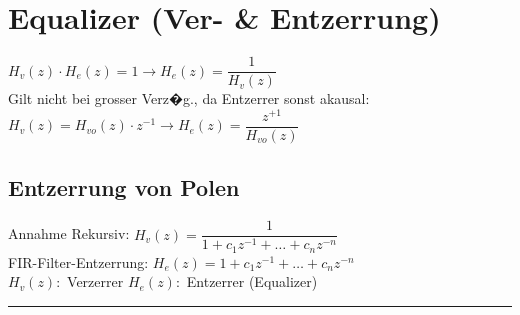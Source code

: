 \begin{minipage}{9cm}
\section{Equalizer (Ver- \& Entzerrung)}
			$H_v(z)\cdot H_e(z)=1 \longrightarrow H_e(z)=\dfrac{1}{H_v(z)}$\\

			Gilt nicht bei grosser Verz�g., da Entzerrer sonst akausal:\\
			$H_v(z)=H_{vo}(z)\cdot z^{-1} \rightarrow
			 H_e(z)=\dfrac{z^{+1}}{H_{vo}(z)}$

    \end{minipage}
		\hfill
    \begin{minipage}{9cm}    	
			\subsection{Entzerrung von Polen}
			Annahme Rekursiv: $H_v(z)=\dfrac{1}{1+c_1z^{-1}+ \ldots
			+c_nz^{-n}}$\\ 
			FIR-Filter-Entzerrung: $H_e(z)=1+c_1z^{-1}+\ldots+c_nz^{-n}$\\
			
			$H_v(z):$ Verzerrer \hspace{0.5cm} $H_e(z):$ Entzerrer (Equalizer)
    \end{minipage}
		
\vspace{0.25cm}
		
\hrule

